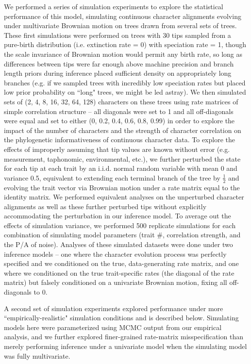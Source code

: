 We performed a series of simulation experiments to explore the statistical performance of this model, simulating continuous character alignments evolving under multivariate Brownian motion on trees drawn from several sets of trees. These first simulations were performed on trees with 30 tips sampled from a pure-birth \citep{yuleMathematicalTheoryEvolution1925} distribution (i.e. extinction rate = 0) with speciation rate = 1, though the scale invariance of Brownian motion would permit any birth rate, so long as differences between tips were far enough above machine precision and branch length priors during inference placed sufficient density on appropriately long branches (e.g. if we sampled trees with incredibly low speciation rates but placed low prior probability on ``long" trees, we might be led astray). We then simulated sets of (2, 4, 8, 16, 32, 64, 128) characters on these trees using rate matrices of simple correlation structure – all diagonals were set to 1 and all off-diagonals were equal and set to either (0, 0.2, 0.4, 0.6, 0.8, 0.99) in order to explore the impact of the number of characters and the strength of character correlation on the phylogenetic informativeness of continuous character data. To explore the effects of improperly assuming that tip values are known without error (e.g. measurement, taphonomic, environmental, etc.), we further perturbed the state for each tip at each trait by an i.i.d. normal random variable with mean 0 and variance 0.5, equivalent to extending each terminal branch of the tree by $\frac{1}{2}$ and evolving the trait vector via Brownian motion under a rate matrix equal to the identity matrix. We performed equivalent analyses on the unperturbed character alignments as well as these further perturbed tips without explicitly accommodating the perturbation in our inference model. To average out the effects of simulation variance, we performed 500 replicate simulations for each combination of simulating model parameters (trait \#, correlation strength, and the P/A of noise). Analyses of these simulated datasets were done under two inference models -- one where the character evolution process was perfectly specified and we conditioned on the true, data-generating rate matrix, and one where we conditioned on the true trait-specific rates (the diagonal of the rate matrix) but falsely conditioned on a univariate Brownian motion, fixing all off-diagonals to 0.

A second set of simulation experiments explored performance under more ``empirically-realistic" simulation conditions and is described below. Simulating models here were parameterized using MCMC output from our empirical analysis, and we further explored finer-grained rate-matrix misspecification than merely performing inference under a univariate model when the simulating model was fully multivariate.

